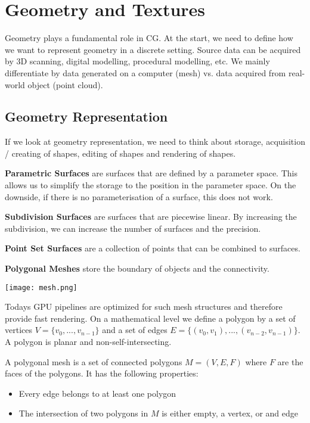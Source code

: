 \section{Geometry and Textures}

Geometry plays a fundamental role in CG. At the start, we need to define how we want to represent geometry in a discrete setting. Source data can be acquired by 3D scanning, digital modelling, procedural modelling, etc. We mainly differentiate by data generated on a computer (mesh) vs. data acquired from real-world object (point cloud).


\subsection{Geometry Representation}
 
If we look at geometry representation, we need to think about storage, acquisition / creating of shapes, editing of shapes and rendering of shapes. \medskip

\textbf{Parametric Surfaces} are surfaces that are defined by a parameter space. This allows us to simplify the storage to the position in the parameter space. On the downside, if there is no parameterisation of a surface, this does not work. \medskip

\textbf{Subdivision Surfaces} are surfaces that are piecewise linear. By increasing the subdivision, we can increase the number of surfaces and the precision. \medskip

\textbf{Point Set Surfaces} are a collection of points that can be combined to surfaces. \medskip

\textbf{Polygonal Meshes} store the boundary of objects and the connectivity.
\begin{center}
	\texttt{[image: mesh.png]}
\end{center}

Todays GPU pipelines are optimized for such mesh structures and therefore provide fast rendering. On a mathematical level we define a polygon by a set of vertices $V = \{v_0, ..., v_{n-1}\}$ and a set of edges $E = \{(v_0, v_1), ..., (v_{n-2}, v_{n-1})\}$. A polygon is planar and non-self-intersecting. \medskip

A polygonal mesh is a set of connected polygons $M = (V, E, F)$ where $F$ are the faces of the polygons. It has the following properties:
\begin{itemize}
	\item Every edge belongs to at least one polygon
	\item The intersection of two polygons in $M$ is either empty, a vertex, or and edge
\end{itemize}


